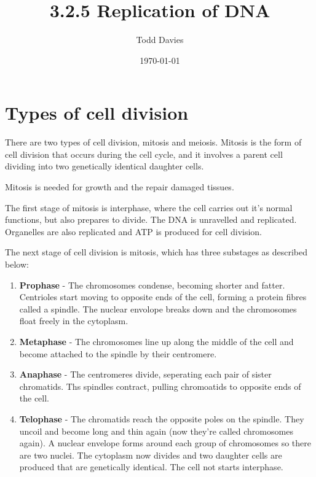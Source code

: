 \documentclass{article}
\author{Todd Davies}
\title{3.2.5 Replication of DNA}
\date{\today}
\begin{document}
\lhead{\today}

\maketitle

\section*{Types of cell division}
\thispagestyle{empty}

There are two types of cell division, mitosis and meiosis. Mitosis is the form of cell division that occurs during the cell
cycle, and it involves a parent cell dividing into two genetically identical
daughter cells.

Mitosis is needed for growth and the repair damaged tissues.

The first stage of mitosis is interphase, where the cell carries out it's normal
functions, but also prepares to divide. The DNA is unravelled and replicated.
Organelles are also replicated and ATP is produced for cell division.

The next stage of cell division is mitosis, which has three substages as
described below:

\begin{enumerate}

	\item {\bf Prophase} - The chromosomes condense, becoming shorter and fatter.
	Centrioles start moving to opposite ends of the cell, forming a protein
	fibres called a spindle. The nuclear envolope breaks down and the
	chromosomes float freely in the cytoplasm.

	\item {\bf Metaphase} - The chromosomes line up along the middle of the cell
	and become attached to the spindle by their centromere.

	\item {\bf Anaphase} - The centromeres divide, seperating each pair of
	sister chromatids. Ths spindles contract, pulling chromoatids to opposite
	ends of the cell.

	\item {\bf Telophase} - The chromatids reach the opposite poles on the
	spindle. They uncoil and become long and thin again (now they're called
	chromosomes again). A nuclear envelope forms around each group of
	chromosomes so there are two nuclei. The cytoplasm now divides and two
	daughter cells are produced that are genetically identical. The cell not
	starts interphase.

\end{enumerate}
\end{document}
